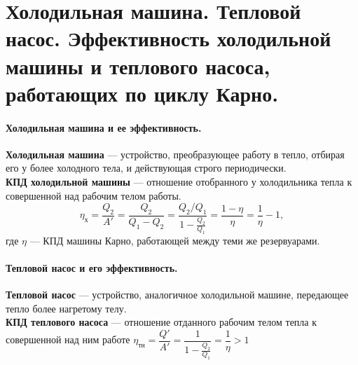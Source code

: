 \section{\normalsize Холодильная машина. Тепловой насос. Эффективность холодильной машины и теплового насоса, работающих по циклу Карно.}
\paragraph{Холодильная машина и ее эффективность.} \textbf{Холодильная машина} --- устройство, преобразующее работу в тепло, отбирая его у более холодного тела, и действующая строго периодически.\\
\textbf{КПД холодильной машины} --- отношение отобранного у холодильника тепла к совершенной над рабочим телом работы. $$\eta_\text{х}=\dfrac{Q_2}{A'}=\dfrac{Q_2}{Q_1-Q_2}=\dfrac{Q_2/Q_1}{1-\frac{Q_2}{Q_1}}=\dfrac{1-\eta}{\eta}=\dfrac{1}{\eta}-1,$$ где $\eta$ --- КПД машины Карно, работающей между теми же резервуарами.
\paragraph{Тепловой насос и его эффективность.} \textbf{Тепловой насос} --- устройство, аналогичное холодильной машине, передающее тепло более нагретому телу.\\
\textbf{КПД теплового насоса} --- отношение отданного рабочим телом тепла к совершенной над ним работе $\eta_\text{тн}=\dfrac{Q'}{A'}=\dfrac{1}{1-\frac{Q_2}{Q_1}}=\dfrac{1}{\eta}>1$ 